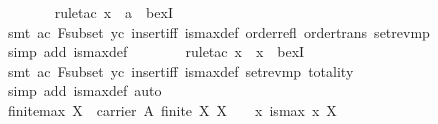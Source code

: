 \begin{isabellebody}
\ \ \ \ \ \ \isamarkupfalse%
\ {}rule{}tac\ x\ {}\ a\ \ bexI{}\isanewline
\ \ \ \ \ \ \isamarkupfalse%
\ {}smt\ ac\ F{}subset\ yc\ insert{}iff\ is{}max{}def\ order{}refl\ order{}trans\ set{}rev{}mp{}\isanewline
\ \ \ \ \ \ \isamarkupfalse%
\ {}simp\ add{}\ is{}max{}def{}\isanewline
\ \ \ \ \ \ \isamarkupfalse%
\ {}rule{}tac\ x\ {}\ x\ \ bexI{}\isanewline
\ \ \ \ \ \ \isamarkupfalse%
\ {}smt\ ac\ F{}subset\ yc\ insert{}iff\ is{}max{}def\ set{}rev{}mp\ totality{}\isanewline
\ \ \ \ \ \ \isamarkupfalse%
\ {}simp\ add{}\ is{}max{}def{}\ auto{}\isanewline
\ \ \isamarkupfalse%
%
\endisatagproof
{\isafoldproof}%
%
\isadelimproof
\isanewline
%
\endisadelimproof
\isanewline
\ \ \isamarkupfalse%
\ finite{}max{}\ {}{}X\ {}\ carrier\ A{}\ finite\ X{}\ X\ {}\ {}{}{}\ {}\ {}x{}\ is{}max\ x\ X{}\isanewline

\end{isabellebody}
